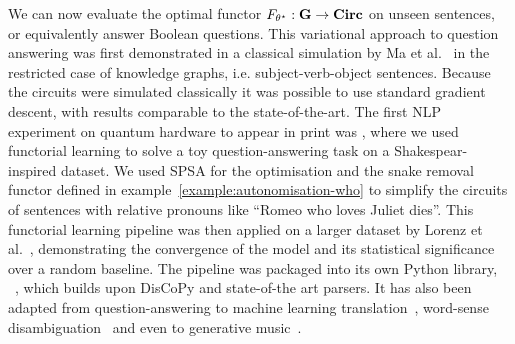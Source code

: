 We can now evaluate the optimal functor $F_{\theta^\star} : \mathbf{G} \to \mathbf{Circ}$ on unseen sentences, or equivalently answer Boolean questions.
This variational approach to question answering was first demonstrated in a classical simulation by Ma et al.~\cite{MaEtAl19} in the restricted case of knowledge graphs, i.e. subject-verb-object sentences.
Because the circuits were simulated classically it was possible to use standard gradient descent, with results comparable to the state-of-the-art.
The first NLP experiment on quantum hardware to appear in print was \cite{MeichanetzidisEtAl20}, where we used functorial learning to solve a toy question-answering task on a Shakespear-inspired dataset.
We used SPSA for the optimisation and the snake removal functor defined in example~\ref{example:autonomisation-who} to simplify the circuits of sentences with relative pronouns like ``Romeo who loves Juliet dies''.
This functorial learning pipeline was then applied on a larger dataset by Lorenz et al.~\cite{LorenzEtAl21}, demonstrating the convergence of the model and its statistical significance over a random baseline.
The pipeline was packaged into its own Python library, ~\cite{KartsaklisEtAl21}, which builds upon DisCoPy and state-of-the art parsers.
It has also been adapted from question-answering to machine learning translation~\cite{AbbaszadeEtAl21,VicenteNieto21}, word-sense disambiguation~\cite{Hoffmann21} and even to generative music~\cite{MirandaEtAl21}.
